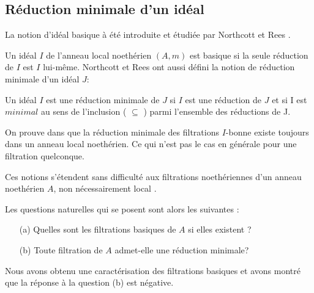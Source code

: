 \subsection{Réduction minimale d'un idéal}
La notion d'idéal basique à été introduite et étudiée par Northcott et Rees \cite{4}.
\begin{madefinition}
	Un idéal $I$ de l'anneau local noethérien $(A,m)$ est basique si la seule réduction de $I$ est $I$ lui-m\^{e}me. 
	Northcott et Rees ont aussi défini la notion de réduction minimale
	d'un idéal $J$:
	
	Un idéal $I$ est une réduction minimale de $J$ si $I$ est une réduction de $J$ et si I est $minimal$ au sens de l'inclusion ( $\subseteq$ ) parmi l'ensemble des réductions de J. 
\end{madefinition}
\begin{maremarque}
	On prouve dans \cite{2} que la réduction minimale des filtrations $I$-bonne existe toujours dans un anneau local noethérien. Ce qui n'est pas le cas en générale pour une filtration quelconque.
\end{maremarque}
Ces notions s'étendent sans difficulté aux filtrations noethériennes d'un anneau noethérien $A$, non nécessairement local \cite{2}. 

Les questions naturelles qui se posent sont alors les suivantes :
\begin{enumerate}
	\item[(a)] Quelles sont les filtrations basiques de $A$ si elles existent ?
	\item[(b)] Toute filtration de $A$ admet-elle une réduction minimale?
\end{enumerate}

Nous avons obtenu une caractérisation des filtrations basiques et avons
montré que la réponse à la question (b) est négative.

